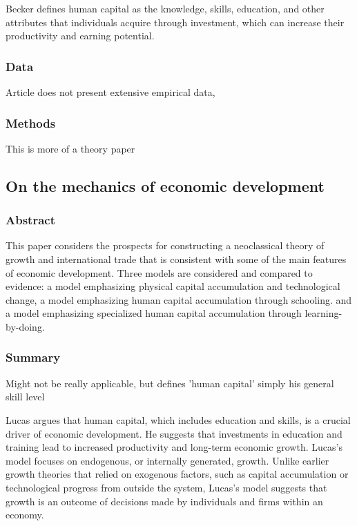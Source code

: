 \documentclass[12pt]{article}
\begin{document}
Becker defines human capital as the knowledge, skills, education, and other attributes that individuals acquire through investment, which can increase their productivity and earning potential.

\subsubsection*{Data}

Article does not present extensive empirical data, 

\subsubsection*{Methods}

This is more of a theory paper

\subsection*{On the mechanics of economic development\cite{on_the_mechanics}}

\subsubsection*{Abstract}

This paper considers the prospects for constructing a neoclassical theory of growth and international trade that is consistent with some of the main features of economic development. Three models are considered and compared to evidence: a model emphasizing physical capital accumulation and technological change, a model emphasizing human capital accumulation through schooling. and a model emphasizing specialized human capital accumulation through learning-by-doing.


\subsubsection*{Summary}

Might not be really applicable, but defines 'human capital' simply his general skill level

Lucas argues that human capital, which includes education and skills, is a crucial driver of economic development. He suggests that investments in education and training lead to increased productivity and long-term economic growth.  Lucas's model focuses on endogenous, or internally generated, growth. Unlike earlier growth theories that relied on exogenous factors, such as capital accumulation or technological progress from outside the system, Lucas's model suggests that growth is an outcome of decisions made by individuals and firms within an economy.
\end{document}
